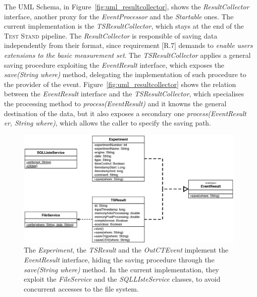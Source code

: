 The UML Schema, in Figure~\ref{fig:uml_resultcollector}, shows the \textit{ResultCollector} interface, another proxy for the \textit{EventProcessor} and the \textit{Startable} ones. The current implementation is the \textit{TSResultCollector}, which stays at the end of the \textsc{Test Stand} pipeline. The \textit{ResultCollector} is responsible of saving data independently from their format, since requirement [R.7] demands to \textit{enable users extensions to the basic measurement set}. The \textit{TSResultCollector} applies a general saving procedure exploiting the \textit{EventResult} interface, which exposes the \textit{save(String where)} method, delegating the implementation of such procedure to the provider of the event. Figure~\ref{fig:uml_resultcollector} shows the relation between the \textit{EventResult} interface and the \textit{TSResultCollector}, which specialises the processing method to \textit{process(EventResult)} and it knowns the general destination of the data, but it also exposes a secondary one \textit{process(EventResult er, String where)}, which allows the caller to specify the saving path.


\begin{figure}[tbh]
  \centering
	\includegraphics[width=\linewidth]{images/uml_resultcollector_events}
	\caption[\textsc{ResultCollector} Events - UML Schema]{The \textit{Experiment}, the \textit{TSResult} and the \textit{OutCTEvent} implement the \textit{EventResult} interface, hiding the saving procedure through the \textit{save(String where)} method. In the current implementation, they exploit the \textit{FileService} and the \textit{SQLLIsteService} classes, to avoid concurrent accesses to the file system.} 
  	\label{fig:uml_resultcollector_events}
\end{figure}

\pagebreak


